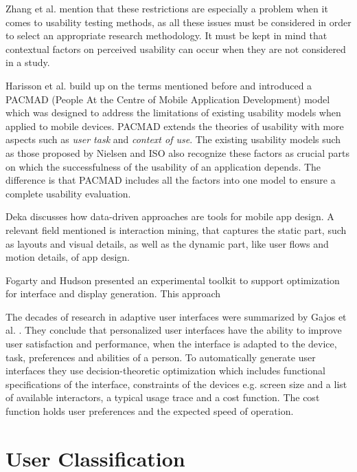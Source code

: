 Zhang et al. mention that these restrictions are especially a problem when it comes to usability testing methods, as all these issues must be considered in order to select an appropriate research methodology. It must be kept in mind that contextual factors on perceived usability can occur when they are not considered in a study.

Harisson et al. \cite{harrison2013usability} build up on the terms mentioned before and introduced a PACMAD (People At the Centre of Mobile Application Development) model which was designed to address the limitations of existing usability models when applied to mobile devices. PACMAD extends the theories of usability with more aspects such as \textit{user task} and \textit{context of use}. The existing usability models such as those proposed by Nielsen \cite{nielsen1994usability} and ISO \cite{bevan1998iso} also recognize these factors as crucial parts on which the successfulness of the usability of an application depends. The difference is that PACMAD includes all the factors into one model to ensure a complete usability evaluation.

Deka \cite{deka2016data} discusses how data-driven approaches are tools for mobile app design. A relevant field mentioned is interaction mining, that captures the static part, such as layouts and visual details, as well as the dynamic part, like user flows and motion details, of app design.

Fogarty and Hudson \cite{fogarty2003gadget} presented an experimental toolkit to support optimization for interface and display generation. This approach


The decades of research in adaptive user interfaces were summarized by Gajos et al. \cite{gajos2008decision}. They conclude that personalized user interfaces have the ability to improve user satisfaction and performance, when the interface is adapted to the device, task, preferences and abilities of a person. To automatically generate user interfaces they use decision-theoretic optimization which includes functional specifications of the interface, constraints of the devices e.g. screen size and a list of available interactors, a typical usage trace and a cost function. The cost function holds user preferences and the expected speed of operation.



\section{User Classification}


